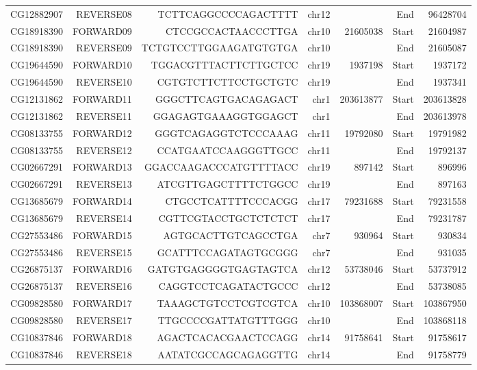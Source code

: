 \begin{table}[htbp]
\begin{tabular}{rrrrrrr}
    CG12882907 & REVERSE08 & TCTTCAGGCCCCAGACTTTT & chr12 &       & End   & 96428704 \\
    CG18918390 & FORWARD09 & CTCCGCCACTAACCCTTGA & chr10 & 21605038 & Start & 21604987 \\
    CG18918390 & REVERSE09 & TCTGTCCTTGGAAGATGTGTGA & chr10 &       & End   & 21605087 \\
    CG19644590 & FORWARD10 & TGGACGTTTACTTCTTGCTCC & chr19 & 1937198 & Start & 1937172 \\
    CG19644590 & REVERSE10 & CGTGTCTTCTTCCTGCTGTC & chr19 &       & End   & 1937341 \\
    CG12131862 & FORWARD11 & GGGCTTCAGTGACAGAGACT & chr1  & 203613877 & Start & 203613828 \\
    CG12131862 & REVERSE11 & GGAGAGTGAAAGGTGGAGCT & chr1  &       & End   & 203613978 \\
    CG08133755 & FORWARD12 & GGGTCAGAGGTCTCCCAAAG & chr11 & 19792080 & Start & 19791982 \\
    CG08133755 & REVERSE12 & CCATGAATCCAAGGGTTGCC & chr11 &       & End   & 19792137 \\
    CG02667291 & FORWARD13 & GGACCAAGACCCATGTTTTACC & chr19 & 897142 & Start & 896996 \\
    CG02667291 & REVERSE13 & ATCGTTGAGCTTTTCTGGCC & chr19 &       & End   & 897163 \\
    CG13685679 & FORWARD14 & CTGCCTCATTTTCCCACGG & chr17 & 79231688 & Start & 79231558 \\
    CG13685679 & REVERSE14 & CGTTCGTACCTGCTCTCTCT & chr17 &       & End   & 79231787 \\
    CG27553486 & FORWARD15 & AGTGCACTTGTCAGCCTGA & chr7  & 930964 & Start & 930834 \\
    CG27553486 & REVERSE15 & GCATTTCCAGATAGTGCGGG & chr7  &       & End   & 931035 \\
    CG26875137 & FORWARD16 & GATGTGAGGGGTGAGTAGTCA & chr12 & 53738046 & Start & 53737912 \\
    CG26875137 & REVERSE16 & CAGGTCCTCAGATACTGCCC & chr12 &       & End   & 53738085 \\
    CG09828580 & FORWARD17 & TAAAGCTGTCCTCGTCGTCA & chr10 & 103868007 & Start & 103867950 \\
    CG09828580 & REVERSE17 & TTGCCCCGATTATGTTTGGG & chr10 &       & End   & 103868118 \\
    CG10837846 & FORWARD18 & AGACTCACACGAACTCCAGG & chr14 & 91758641 & Start & 91758617 \\
    CG10837846 & REVERSE18 & AATATCGCCAGCAGAGGTTG & chr14 &       & End   & 91758779 \\

\end{tabular}
\end{table}
